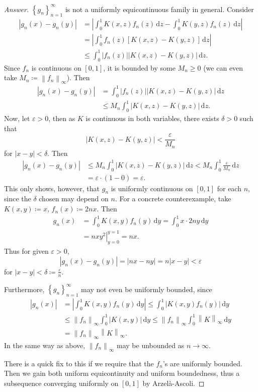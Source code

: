 \documentclass[12pt]{article}
\newcommand\setb[1]{\left \{ #1 \right \}}
\newcommand{\sqbrack}[1]{\left [ #1 \right ]}
\newcommand{\abs}[1]{\left | #1 \right |}
\newcommand{\norm}[1]{\left\| #1 \right\|}
\newcommand{\eps}{\varepsilon}
\renewcommand{\i}[4]{\int_{#1}^{#2} {#3} \, \mathrm{d} {#4} }
\theoremstyle{definition}
\begin{document}
\begin{proof}[Answer]
    $\setb{ g_n }_{n = 1}^{\infty}$ is not a uniformly equicontinuous family in general. Consider 
    \begin{align*}
        \abs{ g_n(x) - g_n(y) } & = \abs{ \i{0}{1}{ K(x,z) f_n(z) }{z} - \i{0}{1}{ K(y,z) f_n(z) }{z} } \\ 
        & = \abs{ \i{0}{1}{ f_n(z) \sqbrack{ K(x,z) - K(y,z) } }{z} } \\ 
        & \leq \i{0}{1}{ \abs{ f_n(z) } \abs{ K(x,z) - K(y,z) } }{z} . 
    \end{align*}
    Since $f_n$ is continuous on $[0,1]$, it is bounded by some $M_n \geq 0$ (we can even take $M_n \coloneqq \norm{ f_n }_{\infty}$). Then 
    \begin{align*}
        \abs{ g_n(x) - g_n(y) } & = \i{0}{1}{ \abs{ f_n(z) } \abs{ K(x,z) - K(y,z) } }{z} \\ 
        & \leq M_n \i{0}{1}{ \abs{ K(x,z) - K(y,z) } }{z} . 
    \end{align*}
    Now, let $\eps > 0$, then as $K$ is continuous in both variables, there exists $\delta > 0$ such that 
    \[
        \abs{ K(x,z) - K(y,z) } < \frac{\eps}{M_n}
    \]
    for $\abs{x - y} < \delta$. Then 
    \begin{align*}
        \abs{ g_n(x) - g_n(y) } & \leq M_n \i{0}{1}{ \abs{ K(x,z) - K(y,z) } }{z} < M_n \i{0}{1}{ \frac{\eps}{M_n} }{z} \\ 
        & = \eps \cdot (1 - 0) = \eps . 
    \end{align*}
    This only shows, however, that $g_n$ is uniformly continuous on $[0,1]$ for each $n$, since the $\delta$ chosen may depend on $n$. For a concrete counterexample, take $K(x,y) \coloneqq x$, $f_n(x) \coloneqq 2nx$. Then 
    \begin{align*}
        g_n(x) & = \i{0}{1}{K(x,y) f_n(y)}{y} = \i{0}{1}{x \cdot 2ny}{y} \\ 
        & = \left. {nx y^2} \right|_{y = 0}^{y = 1} = nx . 
    \end{align*}
    Thus for given $\eps > 0$,
    \[
        \abs{ g_n(x) - g_n(y) } = \abs{ nx - ny } = n \abs{ x - y } < \eps 
    \]
    for $\abs{x - y} < \delta \coloneqq \frac{\eps}{n}$. 
    
    Furthermore, $\setb{ g_n }_{n = 1}^{\infty}$ may not even be uniformly bounded, since 
    \begin{align*}
        \abs{ g_n(x) } & = \abs{ \i{0}{1}{ K(x,y) f_n(y) }{y} } \leq \i{0}{1}{ \abs{ K(x,y) f_n(y) } }{y} \\ 
        & \leq \norm{ f_n }_{\infty} \i{0}{1}{ \abs{ K(x,y) } }{y} \leq \norm{ f_n }_{\infty} \i{0}{1}{ \norm{ K }_{\infty} }{y} \\ 
        & = \norm{ f_n }_{\infty} \norm{ K }_{\infty} .
    \end{align*}
    In the same way as above, $\norm{ f_n }_{\infty}$ may be unbounded as $n \to \infty$. 
    
    There is a quick fix to this if we require that the $f_n$'s are uniformly bounded. Then we gain both uniform equicontinuity and uniform boundedness, thus a subsequence converging uniformly on $[0,1]$ by Arzel\`a-Ascoli.
\end{proof}
\end{document}
